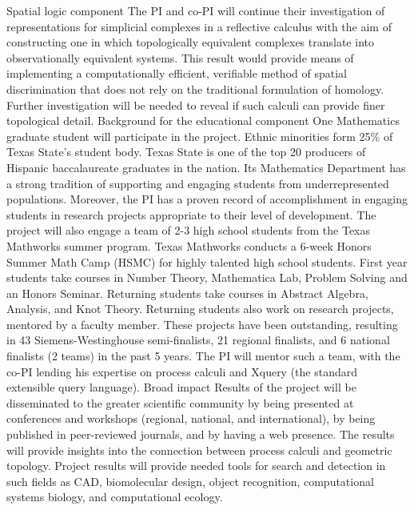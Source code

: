 \documentclass[12pt]{amsart}
\begin{document}
Spatial logic component
The PI and co-PI will continue their investigation of representations for simplicial complexes in a reflective calculus with the aim of constructing one in which topologically equivalent complexes translate into observationally equivalent systems. This result would provide means of implementing a computationally efficient, verifiable method of spatial discrimination that does not rely on the traditional formulation of homology. Further investigation will be needed to reveal if such calculi can provide finer topological detail.
Background for the educational component
One Mathematics graduate student will participate in the project. Ethnic minorities form 25\% of Texas State’s student body. Texas State is one of the top 20 producers of Hispanic baccalaureate graduates in the nation. Its Mathematics Department has a strong tradition of supporting and engaging students from underrepresented populations. Moreover, the PI has a proven record of accomplishment in engaging students in research projects appropriate to their level of development.
The project will also engage a team of 2-3 high school students from the Texas Mathworks summer program. Texas Mathworks conducts a 6-week Honors Summer Math Camp (HSMC) for highly talented high school students. First year students take courses in Number Theory, Mathematica Lab, Problem Solving and an Honors Seminar. Returning students take courses in Abstract Algebra, Analysis, and Knot Theory. Returning students also work on research projects, mentored by a faculty member. These projects have been outstanding, resulting in 43 Siemens-Westinghouse semi-finalists, 21 regional finalists, and 6 national finalists (2 teams) in the past 5 years. The PI will mentor such a team, with the co-PI lending his expertise on process calculi and Xquery (the standard extensible query language).
Broad impact
Results of the project will be disseminated to the greater scientific community by being presented at conferences and workshops (regional, national, and international), by being published in peer-reviewed journals, and by having a web presence.  The results will provide insights into the connection between process calculi and geometric topology. Project results will provide needed tools for search and detection in such fields as CAD, biomolecular design, object recognition, computational systems biology, and computational ecology.






 
\end{document}

